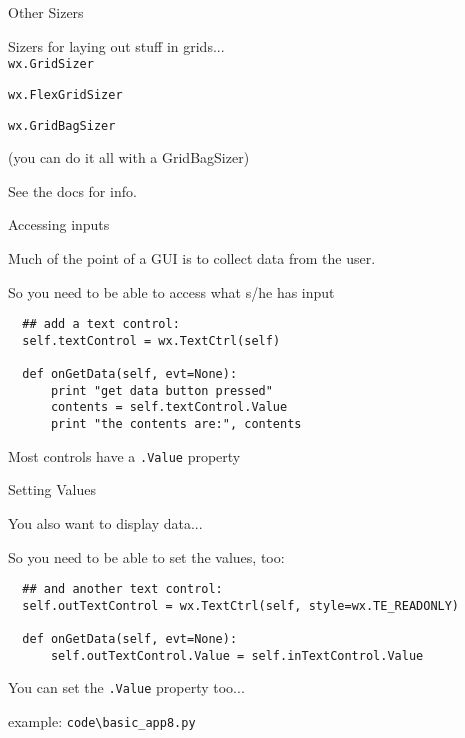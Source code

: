 \documentclass{beamer}
\begin{document}
\begin{frame}[fragile]{Other Sizers}

{\Large Sizers for laying out stuff in grids...}\\

\vfill
{\large \verb`wx.GridSizer`}

\vfill
{\large \verb`wx.FlexGridSizer`}

\vfill
{\large \verb`wx.GridBagSizer`}

\vfill
(you can do it all with a GridBagSizer)

\vfill
See the docs for info.

\end{frame}


\begin{frame}[fragile]{Accessing inputs}

{\Large Much of the point of a GUI is to collect data from the user.}

\vfill
{\large So you need to be able to access what s/he has input}

\begin{verbatim}
  ## add a text control:
  self.textControl = wx.TextCtrl(self)

  def onGetData(self, evt=None):
      print "get data button pressed"
      contents = self.textControl.Value
      print "the contents are:", contents
\end{verbatim}

{\large Most controls have a \verb`.Value` property}

\end{frame}

\begin{frame}[fragile]{Setting Values}

{\Large You also want to display data...}

\vfill
{\large So you need to be able to set the values, too:}

\begin{verbatim}
  ## and another text control:
  self.outTextControl = wx.TextCtrl(self, style=wx.TE_READONLY)

  def onGetData(self, evt=None):        
      self.outTextControl.Value = self.inTextControl.Value

\end{verbatim}

{\large You can set the \verb`.Value` property too...}

\vfill
example: \verb`code\basic_app8.py`

\end{frame}
\end{document}
